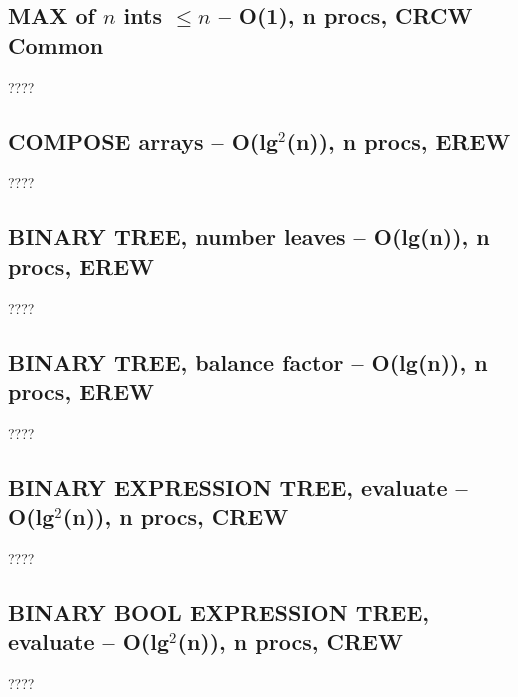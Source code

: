 \documentclass[12pt]{article}
\begin{document}
\subsection{MAX of $n$ ints $\leq n$ -- O(1), n procs, CRCW Common}
????


\subsection{COMPOSE arrays -- O(lg$^2$(n)), n procs, EREW}
????

\subsection{BINARY TREE, number leaves -- O(lg(n)), n procs, EREW}
????


\subsection{BINARY TREE, balance factor -- O(lg(n)), n procs, EREW}
????


\subsection{BINARY EXPRESSION TREE, evaluate -- O(lg$^2$(n)), n procs, CREW}
????

\subsection{BINARY BOOL EXPRESSION TREE, evaluate -- O(lg$^2$(n)), n procs, CREW}
????
\end{document}
